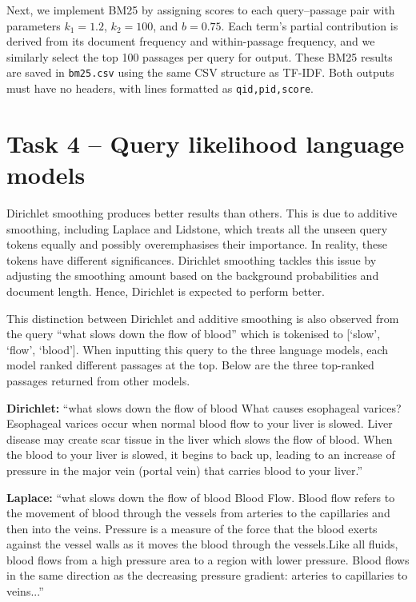 \documentclass[10pt]{article}
\begin{document}
Next, we implement BM25 by assigning scores to each query--passage pair with parameters \(k_1 = 1.2\), \(k_2 = 100\), and \(b = 0.75\). Each term’s partial contribution is derived from its document frequency and within-passage frequency, and we similarly select the top 100 passages per query for output. These BM25 results are saved in \texttt{bm25.csv} using the same CSV structure as TF-IDF. Both outputs must have no headers, with lines formatted as \texttt{qid,pid,score}.

\section{Task 4 -- Query likelihood language models}
Dirichlet smoothing produces better results than others. This is due to additive smoothing, including Laplace and Lidstone, which treats all the unseen query tokens equally and possibly overemphasises their importance. In reality, these tokens have different significances. Dirichlet smoothing tackles this issue by adjusting the smoothing amount based on the background probabilities and document length. Hence, Dirichlet is expected to perform better.

This distinction between Dirichlet and additive smoothing is also observed from the query ``what slows down the flow of blood'' which is tokenised to [‘slow’, ‘flow’, ‘blood’]. When inputting this query to the three language models, each model ranked different passages at the top. Below are the three top-ranked passages returned from other models.

\noindent
\textbf{Dirichlet:} ``what slows down the flow of blood \quad What causes esophageal varices? Esophageal varices occur when normal blood flow to your liver is slowed. Liver disease may create scar tissue in the liver which slows the flow of blood. When the blood to your liver is slowed, it begins to back up, leading to an increase of pressure in the major vein (portal vein) that carries blood to your liver.''

\noindent
\textbf{Laplace:} ``what slows down the flow of blood \quad Blood Flow. Blood flow refers to the movement of blood through the vessels from arteries to the capillaries and then into the veins. Pressure is a measure of the force that the blood exerts against the vessel walls as it moves the blood through the vessels.Like all fluids, blood flows from a high pressure area to a region with lower pressure. Blood flows in the same direction as the decreasing pressure gradient: arteries to capillaries to veins...''
\end{document}
